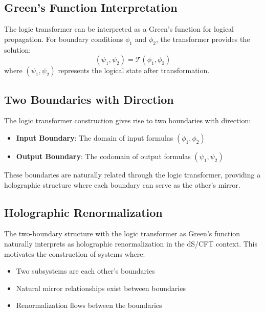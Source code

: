 \subsection{Green's Function Interpretation}

\begin{definition}
\label{def:logic-green-function}
The logic transformer can be interpreted as a Green's function for logical propagation. For boundary conditions $\phi_1$ and $\phi_2$, the transformer provides the solution:
\[
(\psi_1, \psi_2) = \mathcal{T}(\phi_1, \phi_2)
\]
where $(\psi_1, \psi_2)$ represents the logical state after transformation.
\end{definition}

\subsection{Two Boundaries with Direction}

\begin{definition}
\label{def:directed-boundaries}
The logic transformer construction gives rise to two boundaries with direction:
\begin{itemize}
\item \textbf{Input Boundary}: The domain of input formulas $(\phi_1, \phi_2)$
\item \textbf{Output Boundary}: The codomain of output formulas $(\psi_1, \psi_2)$
\end{itemize}

These boundaries are naturally related through the logic transformer, providing a holographic structure where each boundary can serve as the other's mirror.
\end{definition}

\subsection{Holographic Renormalization}

\begin{remark}
\label{rem:holographic-renorm}
The two-boundary structure with the logic transformer as Green's function naturally interprets as holographic renormalization in the dS/CFT context. This motivates the construction of systems where:
\begin{itemize}
\item Two subsystems are each other's boundaries
\item Natural mirror relationships exist between boundaries
\item Renormalization flows between the boundaries
\end{itemize}
\end{remark}

